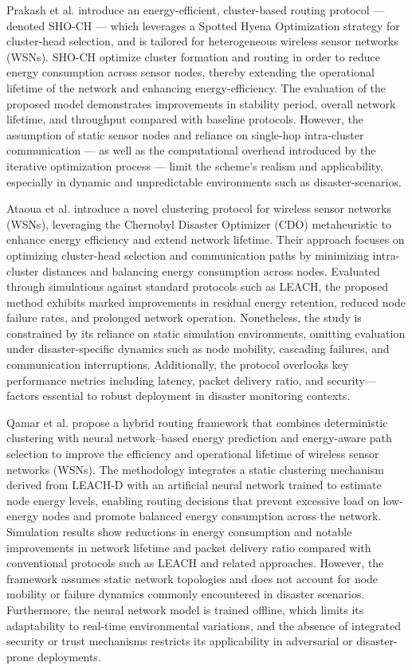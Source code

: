 \documentclass[12pt, onecolumn, journal]{IEEEtran}
\begin{document}
Prakash et al. \cite{prakash2025enhanced} introduce an energy-efficient, cluster-based routing protocol — denoted SHO-CH — which leverages a Spotted Hyena Optimization strategy for cluster-head selection, and is tailored for heterogeneous wireless sensor networks (WSNs). SHO-CH optimize cluster formation and routing in order to reduce energy consumption across sensor nodes, thereby extending the operational lifetime of the network and enhancing energy-efficiency. The evaluation of the proposed model demonstrates improvements in stability period, overall network lifetime, and throughput compared with baseline protocols. However, the assumption of static sensor nodes and reliance on single-hop intra-cluster communication — as well as the computational overhead introduced by the iterative optimization process — limit the scheme’s realism and applicability, especially in dynamic and unpredictable environments such as disaster-scenarios. 

Ataoua et al. \cite{ataoua_chernobyl_2025} introduce a novel clustering protocol for wireless sensor networks (WSNs), leveraging the Chernobyl Disaster Optimizer (CDO) metaheuristic to enhance energy efficiency and extend network lifetime. Their approach focuses on optimizing cluster-head selection and communication paths by minimizing intra-cluster distances and balancing energy consumption across nodes. Evaluated through simulations against standard protocols such as LEACH, the proposed method exhibits marked improvements in residual energy retention, reduced node failure rates, and prolonged network operation. Nonetheless, the study is constrained by its reliance on static simulation environments, omitting evaluation under disaster-specific dynamics such as node mobility, cascading failures, and communication interruptions. Additionally, the protocol overlooks key performance metrics including latency, packet delivery ratio, and security—factors essential to robust deployment in disaster monitoring contexts.

Qamar et al. \cite{qamar_hybrid_2025} propose a hybrid routing framework that combines deterministic clustering with neural network–based energy prediction and energy-aware path selection to improve the efficiency and operational lifetime of wireless sensor networks (WSNs). The methodology integrates a static clustering mechanism derived from LEACH-D with an artificial neural network trained to estimate node energy levels, enabling routing decisions that prevent excessive load on low-energy nodes and promote balanced energy consumption across the network. Simulation results show reductions in energy consumption and notable improvements in network lifetime and packet delivery ratio compared with conventional protocols such as LEACH and related approaches. However, the framework assumes static network topologies and does not account for node mobility or failure dynamics commonly encountered in disaster scenarios. Furthermore, the neural network model is trained offline, which limits its adaptability to real-time environmental variations, and the absence of integrated security or trust mechanisms restricts its applicability in adversarial or disaster-prone deployments.
\end{document}
